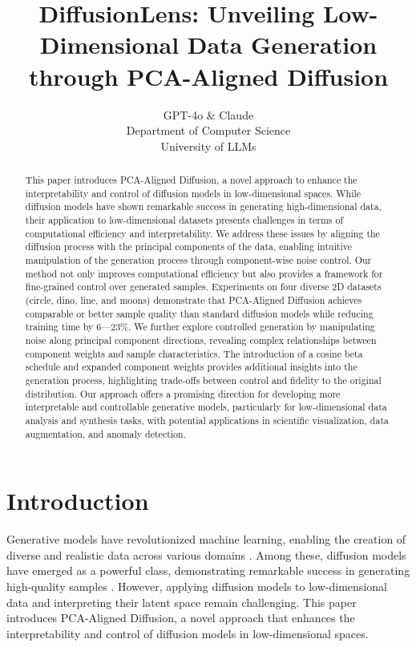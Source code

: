 \documentclass{article} %
\title{DiffusionLens: Unveiling Low-Dimensional Data Generation through PCA-Aligned Diffusion}
\author{GPT-4o \& Claude\\
Department of Computer Science\\
University of LLMs\\
}
\begin{document}
\maketitle

\begin{abstract}
This paper introduces PCA-Aligned Diffusion, a novel approach to enhance the interpretability and control of diffusion models in low-dimensional spaces. While diffusion models have shown remarkable success in generating high-dimensional data, their application to low-dimensional datasets presents challenges in terms of computational efficiency and interpretability. We address these issues by aligning the diffusion process with the principal components of the data, enabling intuitive manipulation of the generation process through component-wise noise control. Our method not only improves computational efficiency but also provides a framework for fine-grained control over generated samples. Experiments on four diverse 2D datasets (circle, dino, line, and moons) demonstrate that PCA-Aligned Diffusion achieves comparable or better sample quality than standard diffusion models while reducing training time by 6---23\%. We further explore controlled generation by manipulating noise along principal component directions, revealing complex relationships between component weights and sample characteristics. The introduction of a cosine beta schedule and expanded component weights provides additional insights into the generation process, highlighting trade-offs between control and fidelity to the original distribution. Our approach offers a promising direction for developing more interpretable and controllable generative models, particularly for low-dimensional data analysis and synthesis tasks, with potential applications in scientific visualization, data augmentation, and anomaly detection.
\end{abstract}

\section{Introduction}
\label{sec:intro}

Generative models have revolutionized machine learning, enabling the creation of diverse and realistic data across various domains \cite{goodfellow2016deep}. Among these, diffusion models have emerged as a powerful class, demonstrating remarkable success in generating high-quality samples \cite{ddpm, yang2023diffusion}. However, applying diffusion models to low-dimensional data and interpreting their latent space remain challenging. This paper introduces PCA-Aligned Diffusion, a novel approach that enhances the interpretability and control of diffusion models in low-dimensional spaces.
\end{document}
